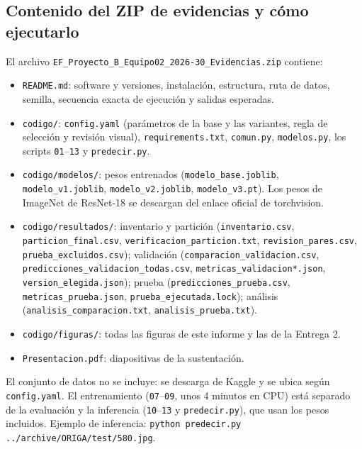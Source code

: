 \documentclass[pdflatex,sn-mathphys-num]{sn-jnl}%
\theoremstyle{thmstyleone}%
\theoremstyle{thmstyletwo}%
\theoremstyle{thmstylethree}%
\begin{document}
\begin{appendices}
\FloatBarrier
\section{Contenido del ZIP de evidencias y cómo ejecutarlo}\label{secA2}

El archivo \texttt{EF\_Proyecto\_B\_Equipo02\_2026-30\_Evidencias.zip} contiene:

{\raggedright
\begin{itemize}\raggedright
\item \texttt{README.md}: software y versiones, instalación, estructura, ruta de datos, semilla, secuencia exacta de ejecución y salidas esperadas.
\item \texttt{codigo/}: \texttt{config.yaml} (parámetros de la base y las variantes, regla de selección y revisión visual), \texttt{requirements.txt}, \texttt{comun.py}, \texttt{modelos.py}, los scripts \texttt{01}--\texttt{13} y \texttt{predecir.py}.
\item \texttt{codigo/modelos/}: pesos entrenados (\texttt{modelo\_base.joblib}, \texttt{modelo\_v1.joblib}, \texttt{modelo\_v2.joblib}, \texttt{modelo\_v3.pt}). Los pesos de ImageNet de ResNet-18 se descargan del enlace oficial de torchvision.
\item \texttt{codigo/resultados/}: inventario y partición (\texttt{inventario.csv}, \texttt{particion\_final.csv}, \texttt{verificacion\_particion.txt}, \texttt{revision\_pares.csv}, \texttt{prueba\_excluidos.csv}); validación (\texttt{comparacion\_validacion.csv}, \texttt{predicciones\_validacion\_todas.csv}, \texttt{metricas\_validacion*.json}, \texttt{version\_elegida.json}); prueba (\texttt{predicciones\_prueba.csv}, \texttt{metricas\_prueba.json}, \texttt{prueba\_ejecutada.lock}); análisis (\texttt{analisis\_comparacion.txt}, \texttt{analisis\_prueba.txt}).
\item \texttt{codigo/figuras/}: todas las figuras de este informe y las de la Entrega 2.
\item \texttt{Presentacion.pdf}: diapositivas de la sustentación.
\end{itemize}
}

El conjunto de datos no se incluye: se descarga de Kaggle y se ubica según \texttt{config.yaml}. El entrenamiento (\texttt{07}--\texttt{09}, unos 4 minutos en CPU) está separado de la evaluación y la inferencia (\texttt{10}--\texttt{13} y \texttt{predecir.py}), que usan los pesos incluidos. Ejemplo de inferencia: \texttt{python predecir.py ../archive/ORIGA/test/580.jpg}.

\end{appendices}
\end{document}
